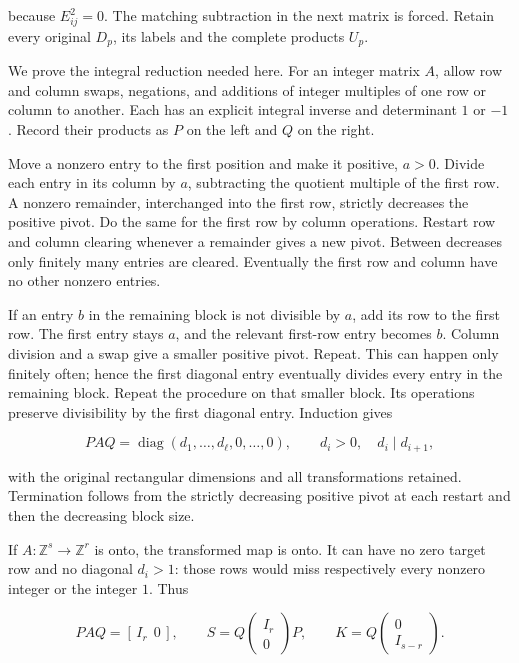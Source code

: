 because \(E_{ij}^2=0\). The matching subtraction in the next matrix is forced. Retain every original \(D_p\), its labels and the complete products \(U_p\).

We prove the integral reduction needed here. For an integer matrix \(A\), allow row and column swaps, negations, and additions of integer multiples of one row or column to another. Each has an explicit integral inverse and determinant \(1\) or \(-1\). Record their products as \(P\) on the left and \(Q\) on the right.

Move a nonzero entry to the first position and make it positive, \(a>0\). Divide each entry in its column by \(a\), subtracting the quotient multiple of the first row. A nonzero remainder, interchanged into the first row, strictly decreases the positive pivot. Do the same for the first row by column operations. Restart row and column clearing whenever a remainder gives a new pivot. Between decreases only finitely many entries are cleared. Eventually the first row and column have no other nonzero entries.

If an entry \(b\) in the remaining block is not divisible by \(a\), add its row to the first row. The first entry stays \(a\), and the relevant first-row entry becomes \(b\). Column division and a swap give a smaller positive pivot. Repeat. This can happen only finitely often; hence the first diagonal entry eventually divides every entry in the remaining block. Repeat the procedure on that smaller block. Its operations preserve divisibility by the first diagonal entry. Induction gives

\begin{equation}
PAQ=\operatorname{diag}(d_1,\ldots,d_\ell,0,\ldots,0),
 \qquad d_i>0,\quad d_i\mid d_{i+1},
 \label{courseIII:integral-handle-chains-and-signed-incidences:eq:4.5}
\end{equation}

with the original rectangular dimensions and all transformations retained. Termination follows from the strictly decreasing positive pivot at each restart and then the decreasing block size.

If \(A:\mathbb Z^s\to\mathbb Z^r\) is onto, the transformed map is onto. It can have no zero target row and no diagonal \(d_i>1\): those rows would miss respectively every nonzero integer or the integer \(1\). Thus

\begin{equation}
PAQ=[\,I_r\ \ 0\,],\qquad
 S=Q\begin{pmatrix}I_r\\0\end{pmatrix}P,\qquad
 K=Q\begin{pmatrix}0\\I_{s-r}\end{pmatrix}.
 \label{courseIII:integral-handle-chains-and-signed-incidences:eq:4.6}
\end{equation}


